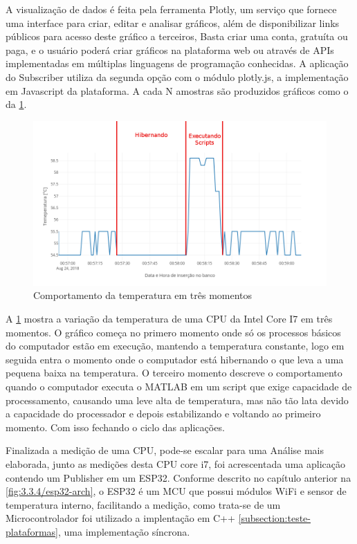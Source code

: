 A visualização de dados é feita pela ferramenta Plotly, um serviço que fornece uma interface para criar, editar e analisar gráficos, além de disponibilizar links públicos para acesso deste gráfico a terceiros, Basta criar uma conta, gratuíta ou paga, e o usuário poderá criar gráficos na plataforma web ou através de APIs implementadas em múltiplas linguagens de programação conhecidas. A aplicação do Subscriber utiliza da segunda opção com o módulo plotly.js, a implementação em Javascript da plataforma. A cada N amostras são produzidos gráficos como o da  \ref{fig:4.1.0/cpu-temp_1}.


\begin{figure}[h!]
\centering
\includegraphics[width=16cm]{./02_Capitulos/02_Cap4/figures/cpu-temp_1}
\caption{Comportamento da temperatura em três momentos}
\label{fig:4.1.0/cpu-temp_1}
\end{figure}

A \ref{fig:4.1.0/cpu-temp_1} mostra a variação da temperatura de uma CPU da Intel Core I7 em três momentos. O gráfico começa no primero momento onde só os processos básicos do computador estão em execução, mantendo a temperatura constante, logo em seguida entra o momento onde o computador está hibernando o que leva a uma pequena baixa na temperatura. O terceiro momento descreve o comportamento quando o computador executa o MATLAB em um script que exige capacidade de processamento, causando uma leve alta de temperatura, mas não tão lata devido a capacidade do processador e depois estabilizando e voltando ao primeiro momento. Com isso fechando o ciclo das aplicações.


Finalizada a medição de uma CPU, pode-se escalar para uma Análise mais elaborada, junto as medições desta CPU core i7, foi acrescentada uma aplicação contendo um Publisher em um ESP32. Conforme descrito no capítulo anterior na \ref{fig:3.3.4/esp32-arch}, o ESP32 é um MCU que possui módulos WiFi e sensor de temperatura interno, facilitando a medição, como trata-se de um Microcontrolador foi utilizado a implentação em C++ \ref{subsection:teste-plataformas}, uma implementação síncrona.


